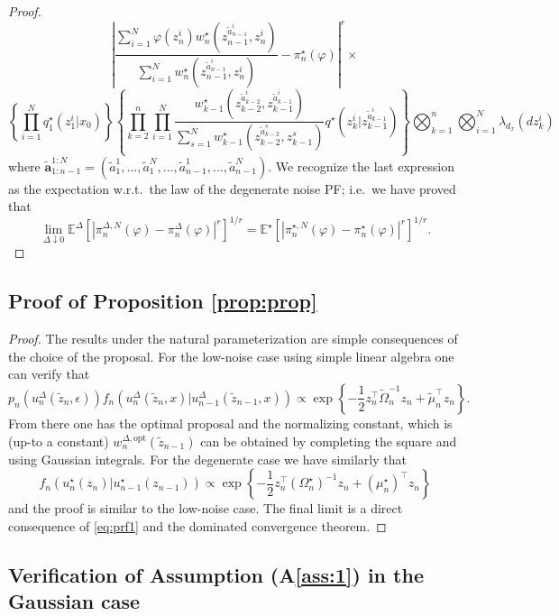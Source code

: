 \documentclass[english,13pt]{article}
\numberwithin{equation}{section}
\begin{document}
\begin{proof}
$$\left|
\frac{\sum_{i=1}^N \varphi(z_n^i)
w_{n}^{\star}(z_{n-1}^{\widetilde{a}_{n-1}^i},z_{n}^{i})}
{\sum_{i=1}^N
w_{n}^{\star}(z_{n-1}^{\widetilde{a}_{n-1}^i},z_{n}^{i})}
-\pi_n^{\star}(\varphi)
\right|^{r} \times
$$
$$
\left\{\prod_{i=1}^N q_1^{\star}(z_1^i|x_0)\right\}\left\{
\prod_{k=2}^n \prod_{i=1}^N \frac{w_{k-1}^{\star}(z_{k-2}^{\widetilde{a}_{k-2}^i},z_{k-1}^{\widetilde{a}_{k-1}^i})}{
\sum_{s=1}^N
w_{k-1}^{\star}(z_{k-2}^{\widetilde{a}_{k-2}^s},z_{k-1}^{s})}
 q^{\star}(z_k^i|z_{k-1}^{\widetilde{a}_{k-1}^i})
\right\}
\bigotimes_{k=1}^n\bigotimes_{i=1}^N \lambda_{d_x}(dz^i_k) 
$$
where $\widetilde{\mathbf{a}}_{1:n-1}^{1:N} = (\widetilde{a}_1^1,\dots,\widetilde{a}_1^N,\dots,\widetilde{a}_{n-1}^1,\dots,\widetilde{a}_{n-1}^N)$.  We recognize the last expression as the expectation w.r.t.~the law of the degenerate noise PF; i.e.~we have proved that
$$
\lim_{\Delta \downarrow 0}\mathbb{E}^{\Delta}\left[\left|\pi_n^{\Delta,N}(\varphi)-\pi_n^{\Delta}(\varphi)\right|^r\right]^{1/r} = 
\mathbb{E}^{\star}\left[\left|\pi_n^{\star,N}(\varphi)-\pi_n^{\star}(\varphi)\right|^r\right]^{1/r}.
$$
\end{proof}

\subsection{Proof of Proposition \ref{prop:prop}}\label{app:inc}

\begin{proof}
The results under the natural parameterization are simple consequences of the choice of the proposal.  For the low-noise case using simple linear algebra one can verify that
$$
p_n(u_n^{\Delta}(\widetilde{z}_n,\epsilon))
f_n(u_n^{\Delta}(\widetilde{z}_n,x)|u_{n-1}^{\Delta}(\widetilde{z}_{n-1},x)) \propto
\exp\left\{
-\frac{1}{2}z_n^{\top}\widetilde{\Omega}_n^{-1}z_n + \widetilde{\mu}_n^{\top}z_n
\right\}.
$$  
From there one has the optimal proposal and the normalizing constant,  which is (up-to a constant) $w_n^{\Delta,\text{opt}}(\widetilde{z}_{n-1})$ can be obtained by completing the square and using Gaussian integrals.  For
the degenerate case we have similarly that
$$
f_n(u_n^{\star}(z_n)|u_{n-1}^{\star}(z_{n-1})) \propto
\exp\left\{
-\frac{1}{2}z_n^{\top}(\Omega_n^{\star})^{-1}z_n + (\mu_n^{\star})^{\top}z_n
\right\}
$$  
and the proof is similar to the low-noise case. The final limit is a direct consequence of \eqref{eq:prf1}
and the dominated convergence theorem.
\end{proof}


\subsection{Verification of Assumption (A\ref{ass:1}) in the Gaussian case}\label{app:a1_gaussian}
\end{document}
